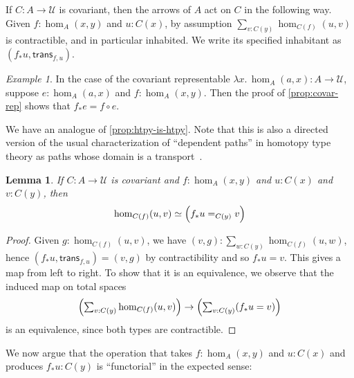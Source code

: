 \documentclass{amsart}
\theoremstyle{plain}
\newtheorem{lem}[thm]{Lemma}
\theoremstyle{definition}
\theoremstyle{remark}
\newtheorem{ex}[thm]{Example}
\numberwithin{equation}{section}
\newcommand{\tsum}{\textstyle\sum}
\newcommand{\univtype}{\mathcal{U}}
\newcommand{\lam}[1]{\lambda #1.\,}
\newcommand{\covtr}[1]{{#1}_*}  %
\newcommand{\istrans}[2]{\mathsf{trans}_{#1,#2}}
\newcommand{\Parens}[1]{\Bigl(#1\Bigr)}
\begin{document}
If $C:A\to\univtype$ is covariant, then the arrows of $A$ act on $C$ in the following way.
Given $f:\hom_A(x,y)$ and $u:C(x)$, by assumption $\sum_{v:C(y)} \hom_{C(f)}(u,v)$ is contractible, and in particular inhabited.
We write its specified inhabitant as $(\covtr f u, \istrans f u)$.

\begin{ex}\label{ex:representable-transport}
  In the case of the covariant representable $\lam{x} \hom_A(a,x) : A\to \univtype$, suppose $e:\hom_A(a,x)$ and $f:\hom_A(x,y)$.
  Then the proof of \cref{prop:covar-rep} shows that $\covtr f e = f\circ e$.
\end{ex}

We have an analogue of \cref{prop:htpy-is-htpy}.
Note that this is also a directed version of the usual characterization of ``dependent paths'' in homotopy type theory as paths whose domain is a transport~\cite[(6.2.2)]{hottbook}.

\begin{lem}\label{thm:covtr-is-eq}
  If $C:A\to\univtype$ is covariant and $f:\hom_A(x,y)$ and $u:C(x)$ and $v:C(y)$, then
  \[ \hom_{C(f)}(u,v) \simeq \Parens{\covtr f u =_{C(y)} v} \]
\end{lem}
\begin{proof}
  Given $g:\hom_{C(f)}(u,v)$, we have $(v,g) : \sum_{w:C(y)}\hom_{C(f)}(u,w)$, hence $(\covtr f u,\istrans f u) = (v,g)$ by contractibility and so $\covtr f u = v$.
  This gives a map from left to right.
  To show that it is an equivalence, we observe that the induced map on total spaces
  \[ \Parens{\tsum_{v:C(y)} \hom_{C(f)}(u,v)} \to \Parens{\tsum_{v:C(y)}(\covtr f u = v)} \]
  is an equivalence, since both types are contractible.
\end{proof}

We now argue that the operation that takes $f:\hom_A(x,y)$ and $u:C(x)$ and produces $\covtr f u : C(y)$ is ``functorial'' in the expected sense:
\end{document}
